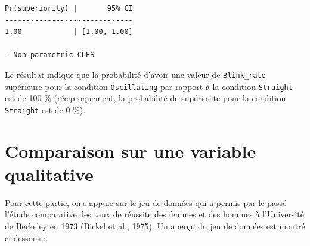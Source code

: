 \documentclass[
  letterpaper,
]{book}
\begin{document}
\begin{verbatim}
Pr(superiority) |       95% CI
------------------------------
1.00            | [1.00, 1.00]

- Non-parametric CLES
\end{verbatim}

Le résultat indique que la probabilité d'avoir une valeur de
\texttt{Blink\_rate} supérieure pour la condition \texttt{Oscillating}
par rapport à la condition \texttt{Straight} est de 100 \%
(réciproquement, la probabilité de supériorité pour la condition
\texttt{Straight} est de 0 \%).

\section{Comparaison sur une variable
qualitative}\label{comparaison-sur-une-variable-qualitative}

Pour cette partie, on s'appuie sur le jeu de données qui a permis par le
passé l'étude comparative des taux de réussite des femmes et des hommes
à l'Université de Berkeley en 1973 (Bickel et al., 1975). Un aperçu du
jeu de données est montré ci-dessous :
\end{document}

